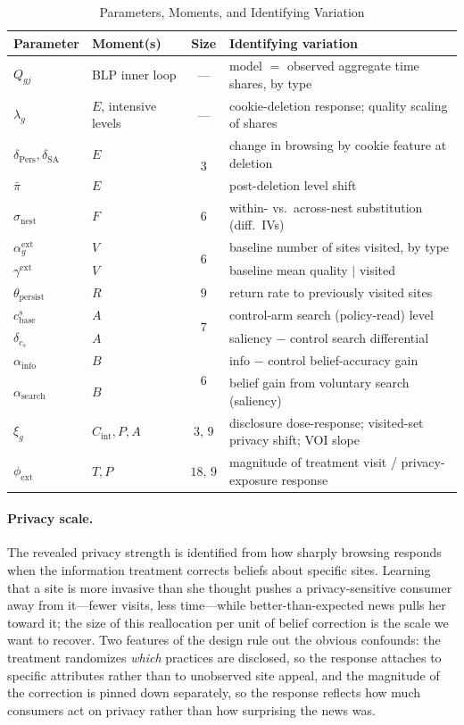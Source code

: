 \documentclass[12pt]{article}
\theoremstyle{definition}
\theoremstyle{remark}
\begin{document}
\begin{table}[ht]
\centering
\caption{Parameters, Moments, and Identifying Variation}\label{tab:em_identification}
\begin{tabular}{@{}llcl@{}}
\toprule
Parameter & Moment(s) & Size & Identifying variation \\
\midrule
$Q_{gj}$ & BLP inner loop & --- & model $=$ observed aggregate time shares, by type \\
$\lambda_g$ & $E$, intensive levels & --- & cookie-deletion response; quality scaling of shares \\
$\delta_{\text{Pers}}, \delta_{\text{SA}}$ & $E$ & \multirow{2}{*}{$3$} & change in browsing by cookie feature at deletion \\
$\bar\pi$ & $E$ & & post-deletion level shift \\
$\sigma_{\text{nest}}$ & $F$ & $6$ & within- vs.\ across-nest substitution (diff.\ IVs) \\
$\alpha^{\text{ext}}_g$ & $V$ & \multirow{2}{*}{$6$} & baseline number of sites visited, by type \\
$\gamma^{\text{ext}}$ & $V$ & & baseline mean quality $\mid$ visited \\
$\theta_{\text{persist}}$ & $R$ & $9$ & return rate to previously visited sites \\
$c^s_{\text{base}}$ & $A$ & \multirow{2}{*}{$7$} & control-arm search (policy-read) level \\
$\delta_{c_s}$ & $A$ & & saliency $-$ control search differential \\
$\alpha_{\text{info}}$ & $B$ & \multirow{2}{*}{$6$} & info $-$ control belief-accuracy gain \\
$\alpha_{\text{search}}$ & $B$ & & belief gain from voluntary search (saliency) \\
$\xi_g$ & $C_{\text{int}}, P, A$ & $3{,}\,9$ & disclosure dose-response; visited-set privacy shift; VOI slope \\
$\phi_{\text{ext}}$ & $T, P$ & $18{,}\,9$ & magnitude of treatment visit / privacy-exposure response \\
\bottomrule
\end{tabular}
\end{table}

\paragraph{Privacy scale.} The revealed privacy strength is identified from how sharply browsing responds when the information treatment corrects beliefs about specific sites. Learning that a site is more invasive than she thought pushes a privacy-sensitive consumer away from it---fewer visits, less time---while better-than-expected news pulls her toward it; the size of this reallocation per unit of belief correction is the scale we want to recover. Two features of the design rule out the obvious confounds: the treatment randomizes \emph{which} practices are disclosed, so the response attaches to specific attributes rather than to unobserved site appeal, and the magnitude of the correction is pinned down separately, so the response reflects how much consumers act on privacy rather than how surprising the news was.
\end{document}
